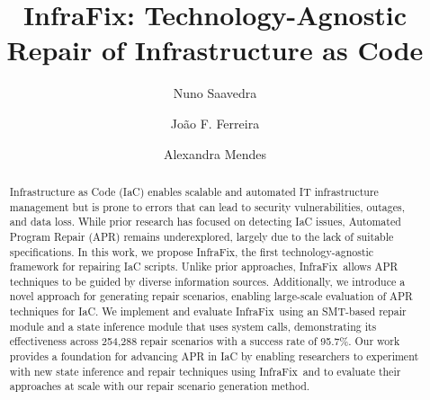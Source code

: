 \documentclass[sigconf,nonacm]{acmart}
\def\name{{\sc InfraFix}}
\begin{document}
\title{\name: Technology-Agnostic Repair of Infrastructure as Code}

\author{Nuno Saavedra}

\author{João F. Ferreira}

\author{Alexandra Mendes}

\renewcommand{\shortauthors}{Saavedra et al.}

\begin{abstract}
Infrastructure as Code (IaC) enables scalable and automated IT infrastructure management but is prone to errors that can lead to security vulnerabilities, outages, and data loss. While prior research has focused on detecting IaC issues, Automated Program Repair (APR) remains underexplored, largely due to the lack of suitable specifications. In this work, we propose \name, the first technology-agnostic framework for repairing IaC scripts. 
Unlike prior approaches, \name\ allows APR techniques to be guided by diverse information sources.
Additionally, we introduce a novel approach for generating repair scenarios, enabling large-scale evaluation of APR techniques for IaC. We implement and evaluate \name\ using an SMT-based repair module and a state inference module that uses system calls, demonstrating its effectiveness across 254,288 repair scenarios with a success rate of 95.7\%. Our work provides a foundation for advancing APR in IaC by enabling researchers to experiment with new state inference and repair techniques using \name\ and to evaluate their approaches at scale with our repair scenario generation method.
\end{abstract}
\end{document}
